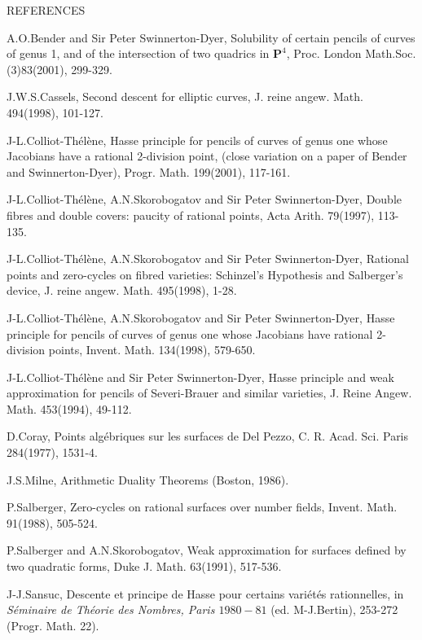 \documentclass[12pt]{article}
\def\bP{{\mathbf P}}
\begin{document}
\newpage

\begin{center} REFERENCES \end{center}

\noindent [1] A.O.Bender and Sir Peter Swinnerton-Dyer, Solubility of certain
pencils of curves of genus 1, and of the intersection of two quadrics in
$\bP^4$, Proc. London Math.Soc. (3)83(2001), 299-329.

\noindent [2] J.W.S.Cassels, Second descent for elliptic curves, J. reine
angew. Math. 494(1998), 101-127.

\noindent [3] J-L.Colliot-Th\'{e}l\`{e}ne, Hasse principle for pencils of
curves of genus one whose Jacobians have a rational 2-division point, (close
variation on a paper of Bender and Swinnerton-Dyer), Progr. Math. 199(2001),
117-161. 

\noindent [4] J-L.Colliot-Th\'{e}l\`{e}ne, A.N.Skorobogatov and Sir Peter
Swinnerton-Dyer, Double fibres and double covers: paucity of rational points,
Acta Arith. 79(1997), 113-135.

\noindent [5] J-L.Colliot-Th\'{e}l\`{e}ne, A.N.Skorobogatov and Sir Peter
Swinnerton-Dyer, Rational points and zero-cycles on fibred varieties:
Schinzel's Hypothesis and Salberger's device, J. reine angew. Math. 495(1998),
1-28.

\noindent [6] J-L.Colliot-Th\'{e}l\`{e}ne, A.N.Skorobogatov and Sir Peter
Swinnerton-Dyer, Hasse principle for pencils of curves of genus one whose
Jacobians have rational 2-division points, Invent. Math. 134(1998), 579-650.

\noindent [7] J-L.Colliot-Th\'{e}l\`{e}ne and Sir Peter Swinnerton-Dyer,
Hasse principle and weak approximation for pencils of Severi-Brauer and
similar varieties, J. Reine Angew. Math. 453(1994), 49-112.

\noindent [8] D.Coray, Points alg\'{e}briques sur les surfaces de Del Pezzo,
C. R. Acad. Sci. Paris 284(1977), 1531-4.

\noindent [9] J.S.Milne, Arithmetic Duality Theorems (Boston, 1986).

\noindent [10] P.Salberger, Zero-cycles on rational surfaces over number
fields, Invent. Math. 91(1988), 505-524.

\noindent [11] P.Salberger and A.N.Skorobogatov, Weak approximation for
surfaces defined by two quadratic forms, Duke J. Math. 63(1991), 517-536.

\noindent [12] J-J.Sansuc, Descente et principe de Hasse pour certains
vari\'{e}t\'{e}s rationnelles, in \textit{S\'{e}minaire de Th\'{e}orie des
Nombres, Paris $1980-81$} (ed. M-J.Bertin), 253-272 (Progr. Math. 22).
\end{document}
